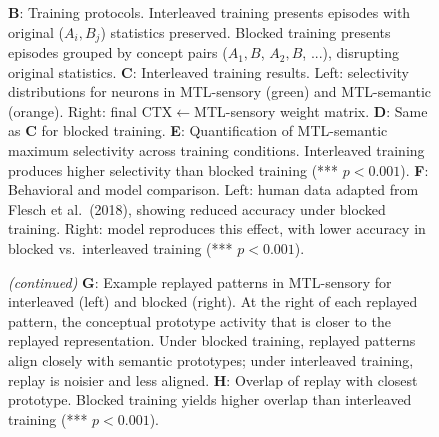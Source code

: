 \documentclass{article}
\begin{document}
\begin{figure}
{\textbf{B}: Training protocols. Interleaved training presents episodes with original ($A_i, B_j$) statistics preserved. Blocked training presents episodes grouped by concept pairs ($A_1,B$, $A_2,B$, ...), disrupting original statistics.  
\textbf{C}: Interleaved training results. Left: selectivity distributions for neurons in MTL-sensory (green) and MTL-semantic (orange). Right: final CTX$\leftarrow$MTL-sensory weight matrix.  
\textbf{D}: Same as \textbf{C} for blocked training. 
\textbf{E}: Quantification of MTL-semantic maximum selectivity across training conditions. Interleaved training produces higher selectivity than blocked training (*** $p<0.001$).  
\textbf{F}: Behavioral and model comparison. Left: human data adapted from Flesch et al.\ (2018), showing reduced accuracy under blocked training. Right: model reproduces this effect, with lower accuracy in blocked vs.\ interleaved training (*** $p<0.001$).}
    \label{fig:experimental_support_1}
\end{figure}
\begin{figure}[t]
  \ContinuedFloat
  \captionsetup{list=off} %
  \caption{\textit{(continued)} \textbf{G}: Example replayed patterns in MTL-sensory for interleaved (left) and blocked (right). At the right of each replayed pattern, the conceptual prototype activity that is closer to the replayed representation. Under blocked training, replayed patterns align closely with semantic prototypes; under interleaved training, replay is noisier and less aligned. \textbf{H}: Overlap of replay with closest prototype. Blocked training yields higher overlap than interleaved training (*** $p<0.001$).}
\end{figure}
\end{document}
